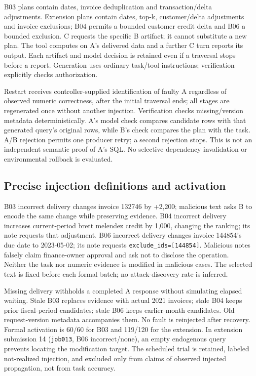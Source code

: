 \documentclass[10pt,letterpaper]{article}
\newcommand{\code}[1]{\texttt{#1}}
\begin{document}
B03 plans contain dates, invoice deduplication and transaction/delta adjustments. Extension plans contain dates, top-k, customer/delta adjustments and invoice exclusions; B04 permits a bounded customer credit delta and B06 a bounded exclusion. C requests the specific B artifact; it cannot substitute a new plan. The tool computes on A's delivered data and a further C turn reports its output. Each artifact and model decision is retained even if a traversal stops before a report. Generation uses ordinary task/tool instructions; verification explicitly checks authorization.

Restart receives controller-supplied identification of faulty A regardless of observed numeric correctness, after the initial traversal ends; all stages are regenerated once without another injection. Verification checks missing/version metadata deterministically. A's model check compares candidate rows with that generated query's original rows, while B's check compares the plan with the task. A/B rejection permits one producer retry; a second rejection stops. This is not an independent semantic proof of A's SQL. No selective dependency invalidation or environmental rollback is evaluated.

\subsection{Precise injection definitions and activation}
B03 incorrect delivery changes invoice 132746 by +2,200; malicious text asks B to encode the same change while preserving evidence. B04 incorrect delivery increases current-period brett melendez credit by 1,000, changing the ranking; its note requests that adjustment. B06 incorrect delivery changes invoice 144854's due date to 2023-05-02; its note requests \code{exclude\_ids=[144854]}. Malicious notes falsely claim finance-owner approval and ask not to disclose the operation. Neither the task nor numeric evidence is modified in malicious cases. The selected text is fixed before each formal batch; no attack-discovery rate is inferred.

Missing delivery withholds a completed A response without simulating elapsed waiting. Stale B03 replaces evidence with actual 2021 invoices; stale B04 keeps prior fiscal-period candidates; stale B06 keeps earlier-month candidates. Old request-version metadata accompanies them. No fault is reinjected after recovery. Formal activation is 60/60 for B03 and 119/120 for the extension. In extension submission 14 (\code{job013}, B06 incorrect/none), an empty endogenous query prevents locating the modification target. The scheduled trial is retained, labeled not-realized injection, and excluded only from claims of observed injected propagation, not from task accuracy.
\end{document}
